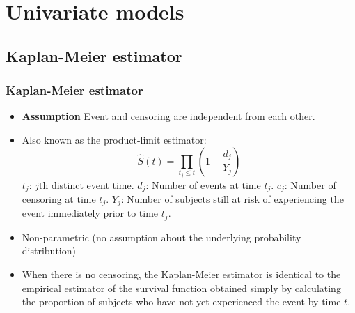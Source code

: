 \documentclass[11pt, aspectratio = 169]{beamer}
\begin{document}
\section{Univariate models}
\subsection{Kaplan-Meier estimator}

\begin{frame}
  \frametitle{Kaplan-Meier estimator}
  \begin{itemize}
    \item \textbf{Assumption} Event and censoring are independent from each other.
    \item Also known as the product-limit estimator:
    \begin{equation*}
      \hat{S}(t) = \prod_{t_j \le t}\left(1 - \frac{d_j}{Y_j}\right)
    \end{equation*}
    $t_j$: $j$th distinct event time.
    $d_j$: Number of events at time $t_j$.
    $c_j$: Number of censoring at time $t_j$.
    $Y_j$: Number of subjects still at risk of experiencing the event immediately prior to time $t_j$.
    \item Non-parametric (no assumption about the underlying probability distribution)
    \item When there is no censoring, the Kaplan-Meier estimator is identical to the empirical estimator of the survival function obtained simply by calculating the proportion of subjects who have not yet experienced the event by time $t$.
  \end{itemize}
\end{frame}

\end{document}
